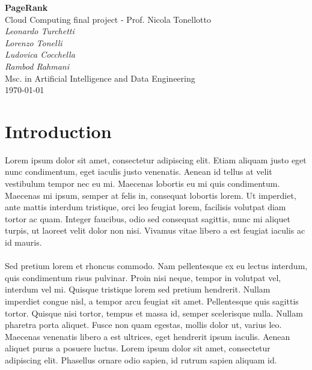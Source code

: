 \documentclass[11pt,a4paper]{article}
\begin{document}
\begin{center}
	\Large\textbf{PageRank}\\
	\vspace{0.2cm}
	\large{Cloud Computing final project - Prof. Nicola Tonellotto}\\
	\vspace{1.0cm}
	\large\textit{Leonardo Turchetti}\\
	\large\textit{Lorenzo Tonelli}\\
	\large\textit{Ludovica Cocchella}\\
	\large\textit{Rambod Rahmani}\\
	\vspace{0.2cm}
	\scriptsize{Msc. in Artificial Intelligence and Data Engineering}\\
	\vspace{1.0cm}
	\today
\end{center}
\tableofcontents
\section{Introduction}
Lorem ipsum dolor sit amet, consectetur adipiscing elit. Etiam aliquam justo eget nunc condimentum, eget iaculis justo venenatis. Aenean id tellus at velit vestibulum tempor nec eu mi. Maecenas lobortis eu mi quis condimentum. Maecenas mi ipsum, semper at felis in, consequat lobortis lorem. Ut imperdiet, ante mattis interdum tristique, orci leo feugiat lorem, facilisis volutpat diam tortor ac quam. Integer faucibus, odio sed consequat sagittis, nunc mi aliquet turpis, ut laoreet velit dolor non nisi. Vivamus vitae libero a est feugiat iaculis ac id mauris.\\
\\
Sed pretium lorem et rhoncus commodo. Nam pellentesque ex eu lectus interdum, quis condimentum risus pulvinar. Proin nisi neque, tempor in volutpat vel, interdum vel mi. Quisque tristique lorem sed pretium hendrerit. Nullam imperdiet congue nisl, a tempor arcu feugiat sit amet. Pellentesque quis sagittis tortor. Quisque nisi tortor, tempus et massa id, semper scelerisque nulla. Nullam pharetra porta aliquet. Fusce non quam egestas, mollis dolor ut, varius leo. Maecenas venenatis libero a est ultrices, eget hendrerit ipsum iaculis. Aenean aliquet purus a posuere luctus. Lorem ipsum dolor sit amet, consectetur adipiscing elit. Phasellus ornare odio sapien, id rutrum sapien aliquam id.
\end{document}
